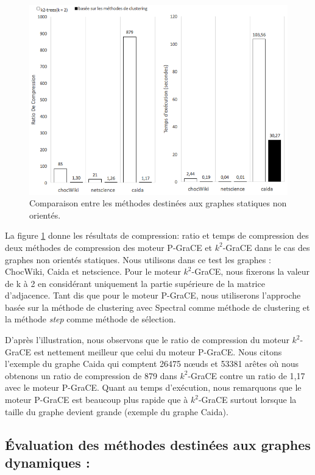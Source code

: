 	\begin{figure}[H]
	\centering
	\includegraphics[scale=0.65]{ressources/image/vogk2.png}
	\caption{Comparaison entre les méthodes destinées aux graphes statiques non orientés.}
	\label{fig:K2-vog}
\end{figure}	

	La figure \ref{fig:K2-vog}  donne les résultats de compression: ratio et temps de compression des deux méthodes de compression des moteur P-GraCE et $k^2$-GraCE dans le cas des graphes non orientés statiques. Nous utilisons dans ce test les graphes : ChocWiki, Caida et netscience. Pour le moteur $k^2$-GraCE, nous fixerons la valeur de k à 2 en considérant uniquement la partie supérieure de la matrice d'adjacence. Tant dis que pour le moteur P-GraCE, nous utiliserons l'approche basée sur la méthode de clustering avec Spectral comme méthode de clustering et la méthode \textit{step} comme méthode de sélection.
	
	D'après l'illustration, nous observons que le ratio de compression du moteur $k^2$-GraCE  est nettement meilleur que celui du moteur P-GraCE. Nous citons l'exemple du graphe Caida qui comptent 26475 nœuds et 53381 arêtes où nous obtenons un ratio de compression de 879 dans $k^2$-GraCE contre un ratio de 1,17 avec le moteur P-GraCE. Quant au temps d'exécution, nous remarquons que le moteur P-GraCE  est beaucoup plus rapide que à $k^2$-GraCE surtout lorsque la taille du graphe devient grande (exemple du graphe Caida).
 
	
	\subsection{Évaluation des méthodes destinées aux graphes dynamiques :}
	
